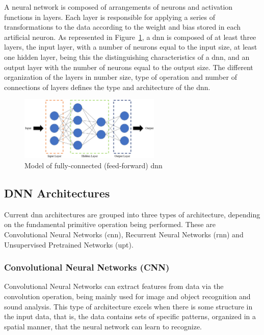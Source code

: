 A neural network is composed of arrangements of neurons and activation functions in layers. Each layer is responsible for applying a series of transformations to the data according to the weight and bias stored in each artificial neuron. As represented in Figure~\ref{fig:DNNarch}, a \acrshort{dnn} is composed of at least three layers, the input layer, with a number of neurons equal to the input size, at least one hidden layer, being this the distinguishing characteristics of a  \acrshort{dnn}, and an output layer with the number of neurons equal to the output size. The different organization of the layers in number size, type of operation and number of connections of layers defines the type and architecture of the  \acrshort{dnn}.

\begin{figure}[!htb]
  \centering
  \includegraphics[width=0.6\textwidth]{Figures/Application To Deep Learning/DNNarch.png}
  \caption{Model of fully-connected (feed-forward) \acrshort{dnn}}
  \label{fig:DNNarch}
\end{figure}

\subsection{DNN Architectures}

Current \acrshort{dnn} architectures are grouped into three types of architecture, depending on the fundamental primitive operation being performed. These are Convolutional Neural Networks (\acrshort{cnn}), Recurrent Neural Networks (\acrshort{rnn}) and Unsupervised Pretrained Networks (\acrshort{upt}). 

\subsubsection{Convolutional Neural Networks (CNN)}
Convolutional Neural Networks can extract features from data via the convolution operation, being mainly used for image and object recognition and sound analysis. This type of architecture excels when there is some structure in the input data, that is, the data contains sets of specific patterns, organized in a spatial manner, that the neural network can learn to recognize.

